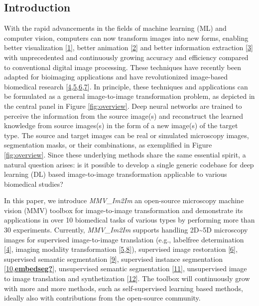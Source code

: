 \hypertarget{introduction}{%
\subsection{Introduction}\label{introduction}}

With the rapid advancements in the fields of machine learning (ML) and computer vision, computers can now transform images into new forms, enabling better visualization {[}\protect\hyperlink{ref-1O0bopKD}{1}{]}, better animation {[}\protect\hyperlink{ref-LxlUp436}{2}{]} and better information extraction {[}\protect\hyperlink{ref-11chATuF4}{3}{]} with unprecedented and continuously growing accuracy and efficiency compared to conventional digital image processing. These techniques have recently been adapted for bioimaging applications and have revolutionized image-based biomedical research {[}\protect\hyperlink{ref-Yq8wZ6hc}{4},\protect\hyperlink{ref-WwenuBHa}{5},\protect\hyperlink{ref-wcCVn8av}{6},\protect\hyperlink{ref-xPgDok51}{7}{]}. In principle, these techniques and applications can be formulated as a general image-to-image transformation problem, as depicted in the central panel in Figure \ref{fig:overview}. Deep neural networks are trained to perceive the information from the source image(s) and reconstruct the learned knowledge from source images(s) in the form of a new image(s) of the target type. The source and target images can be real or simulated microscopy images, segmentation masks, or their combinations, as exemplified in Figure \ref{fig:overview}. Since these underlying methods share the same essential spirit, a natural question arises: is it possible to develop a single generic codebase for deep learning (DL) based image-to-image transformation applicable to various biomedical studies?

In this paper, we introduce \emph{MMV\_Im2Im} an open-source microscopy machine vision (MMV) toolbox for image-to-image transformation and demonstrate its applications in over 10 biomedical tasks of various types by performing more than 30 experiments. Currently, \emph{MMV\_Im2Im} supports handling 2D\textasciitilde5D microscopy images for supervised image-to-image translation (e.g., labelfree determination {[}\protect\hyperlink{ref-Yq8wZ6hc}{4}{]}, imaging modality transformation {[}\protect\hyperlink{ref-WwenuBHa}{5},\protect\hyperlink{ref-UEBDZ3tI}{8}{]}), supervised image restoration {[}\protect\hyperlink{ref-wcCVn8av}{6}{]}, supervised semantic segmentation {[}\protect\hyperlink{ref-TutLhFSz}{9}{]}, supervised instance segmentation {[}\protect\hyperlink{ref-K2ugNcVa}{10},\protect\hyperlink{ref-embedseg}{\textbf{embedseg?}}{]}, unsupervised semantic segmentation {[}\protect\hyperlink{ref-RuFP3CS3}{11}{]}, unsupervised image to image translation and synthetization {[}\protect\hyperlink{ref-6wtIu4QY}{12}{]}. The toolbox will continuously grow with more and more methods, such as self-supervised learning based methods, ideally also with contributions from the open-source community.

